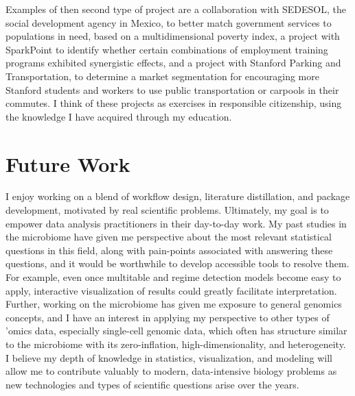\documentclass{article}
\begin{document}
Examples of then second type of project are a collaboration with SEDESOL, the
social development agency in Mexico, to better match government services to
populations in need, based on a multidimensional poverty index, a project with
SparkPoint to identify whether certain combinations of employment training
programs exhibited synergistic effects, and a project with Stanford Parking and
Transportation, to determine a market segmentation for encouraging more Stanford
students and workers to use public transportation or carpools in their commutes.
I think of these projects as exercises in responsible citizenship, using the
knowledge I have acquired through my education.

\section{Future Work}

I enjoy working on a blend of workflow design, literature distillation, and
package development, motivated by real scientific problems. Ultimately, my goal
is to empower data analysis practitioners in their day-to-day work. My past
studies in the microbiome have given me perspective about the most relevant
statistical questions in this field, along with pain-points associated with
answering these questions, and it would be worthwhile to develop accessible
tools to resolve them. For example, even once multitable and regime detection
models become easy to apply, interactive visualization of results could greatly
facilitate interpretation. Further, working on the microbiome has given me
exposure to general genomics concepts, and I have an interest in applying my
perspective to other types of 'omics data, especially single-cell genomic data,
which often has structure similar to the microbiome with its zero-inflation,
high-dimensionality, and heterogeneity. I believe my depth of knowledge in
statistics, visualization, and modeling will allow me to contribute valuably to
modern, data-intensive biology problems as new technologies and types of
scientific questions arise over the years.



\end{document}
